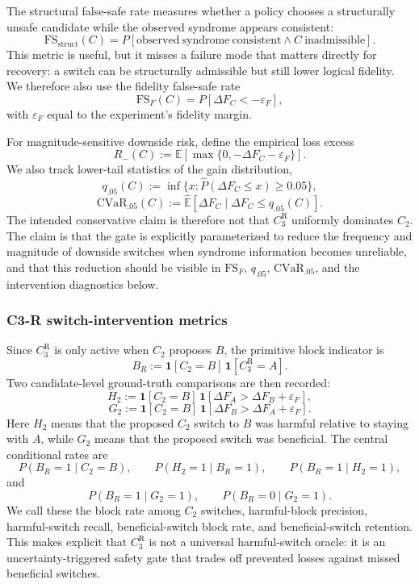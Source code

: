 \documentclass[11pt,a4paper]{article}
\theoremstyle{definition}
\theoremstyle{remark}
\begin{document}
The structural false-safe rate measures whether a policy chooses a structurally unsafe
candidate while the observed syndrome appears consistent:
\[
\mathrm{FS}_{\mathrm{struct}}(C)
=
P\!\left[
\mathrm{observed\ syndrome\ consistent}
\wedge
C\ \mathrm{inadmissible}
\right].
\]
This metric is useful, but it misses a failure mode that matters directly for recovery:
a switch can be structurally admissible but still lower logical fidelity.  We therefore
also use the fidelity false-safe rate
\[
\mathrm{FS}_{F}(C)
=
P\!\left[
\Delta F_C < -\varepsilon_F
\right],
\]
with $\varepsilon_F$ equal to the experiment's fidelity margin.

For magnitude-sensitive downside risk, define the empirical loss excess
\[
R_-(C)
:=
\mathbb{E}\!\left[
\max\{0,-\Delta F_C-\varepsilon_F\}
\right].
\]
We also track lower-tail statistics of the gain distribution,
\[
q_{.05}(C)
:=
\inf\{x:\widehat{P}(\Delta F_C\le x)\ge 0.05\},
\]
\[
\mathrm{CVaR}_{.05}(C)
:=
\widehat{\mathbb{E}}\!\left[
\Delta F_C\mid \Delta F_C\le q_{.05}(C)
\right].
\]
The intended conservative claim is therefore not that $C_3^{\mathrm{R}}$ uniformly
dominates $C_2$.  The claim is that the gate is explicitly parameterized to reduce
the frequency and magnitude of downside switches when syndrome information becomes
unreliable, and that this reduction should be visible in $\mathrm{FS}_F$, $q_{.05}$,
$\mathrm{CVaR}_{.05}$, and the intervention diagnostics below.

\subsubsection*{C3-R switch-intervention metrics}

Since $C_3^{\mathrm{R}}$ is only active when $C_2$ proposes $B$, the primitive block
indicator is
\[
B_R
:=
\mathbf{1}[C_2=B]\,
\mathbf{1}[C_3^{\mathrm{R}}=A].
\]
Two candidate-level ground-truth comparisons are then recorded:
\[
H_2
:=
\mathbf{1}[C_2=B]\,
\mathbf{1}[\Delta F_A>\Delta F_B+\varepsilon_F],
\]
\[
G_2
:=
\mathbf{1}[C_2=B]\,
\mathbf{1}[\Delta F_B>\Delta F_A+\varepsilon_F].
\]
Here $H_2$ means that the proposed $C_2$ switch to $B$ was harmful relative to staying
with $A$, while $G_2$ means that the proposed switch was beneficial.  The central
conditional rates are
\[
P(B_R=1\mid C_2=B),
\qquad
P(H_2=1\mid B_R=1),
\qquad
P(B_R=1\mid H_2=1),
\]
and
\[
P(B_R=1\mid G_2=1),
\qquad
P(B_R=0\mid G_2=1).
\]
We call these the block rate among $C_2$ switches, harmful-block precision,
harmful-switch recall, beneficial-switch block rate, and beneficial-switch retention.
This makes explicit that $C_3^{\mathrm{R}}$ is not a universal harmful-switch oracle:
it is an uncertainty-triggered safety gate that trades off prevented losses against
missed beneficial switches.
\end{document}
